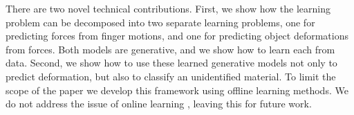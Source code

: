 \documentclass[journal]{IEEEtran}
\newcommand{\alref}[1]{Algorithm~\ref{#1}}
\newcounter{algorithm}
\newenvironment{algorithmicieee}[1]
  {\refstepcounter{algorithm}
   \begin{lrbox}{\ieeealgbox}
   \begin{minipage}{\dimexpr\columnwidth-2\fboxsep-2\fboxrule}
   \textbf{Algorithm \arabic{algorithm}:} \textit{#1} \par
   \begin{algorithmic}[1]}
  {\end{algorithmic}
   \end{minipage}
   \end{lrbox}\noindent\fbox{\usebox{\ieeealgbox}}}
\newcommand{\comment}[1]{{\color{red} #1}}
\begin{document}
\comment{There are two novel technical contributions. First, we show how the learning problem can be decomposed into two separate learning problems, one for predicting forces from finger motions, and one for predicting object deformations from forces. Both models are generative, and we show how to learn each from data. Second, we show how to use these learned generative models not only to predict deformation, but also to classify an unidentified material. To limit the scope of the paper we develop this framework using offline learning methods. We do not address the issue of online learning \cite{worgotter09,antonelli14}, leaving this for future work.}


\end{document}
